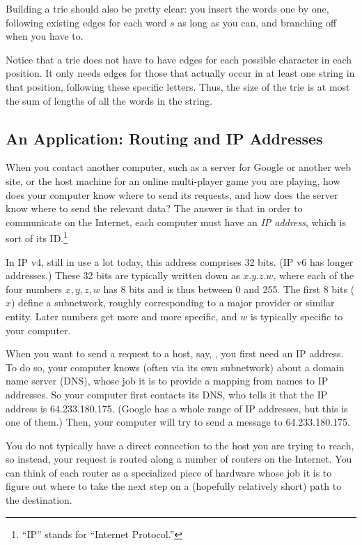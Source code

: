 Building a trie should also be pretty clear: you insert the words one
by one, following existing edges for each word $s$ as long as you can,
and branching off when you have to.

Notice that a trie does not have to have edges for each possible
character in each position. It only needs edges for those that
actually occur in at least one string in that position, following
these specific letters. Thus, the size of the trie is at most the
sum of lengths of all the words in the string.

\subsection{An Application: Routing and IP Addresses}

When you contact another computer, such as a server for Google or
another web site, or the host machine for an online multi-player game
you are playing, how does your computer know where to send its
requests, and how does the server know where to send the relevant
data? The answer is that in order to communicate on the Internet, each
computer must have an \emph{IP address}, which is sort of its
ID.\footnote{``IP'' stands for ``Internet Protocol.''}

In IP v4, still in use a lot today, this address comprises 32
bits. (IP v6 has longer addresses.) These 32 bits are typically
written down as $x.y.z.w$, where each of the four numbers $x, y, z, w$
has 8 bits and is thus between 0 and 255. The first 8 bits  ($x$)
define a subnetwork, roughly corresponding to a major provider or
similar entity. Later numbers get more and more specific, and $w$ is
typically specific to your computer.

When you want to send a request to a host, say,
, you first need an IP address. 
To do so, your computer knows (often via its own subnetwork) about a
domain name server (DNS), whose job it is to provide a mapping from
names to IP addresses. 
So your computer first contacts its DNS, who tells it that the IP
address is 64.233.180.175. 
(Google has a whole range of IP addresses, but this is one of them.)
Then, your computer will try to send a message to 64.233.180.175.

You do not typically have a direct connection to the host you are
trying to reach, so instead, your request is routed along a number of
routers on the Internet. You can think of each router as a specialized
piece of hardware whose job it is to figure out where to take the next
step on a (hopefully relatively short) path to the destination.


